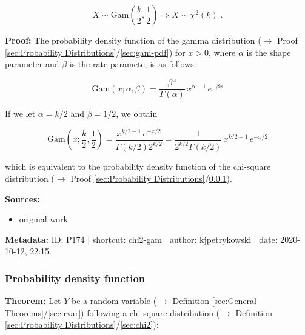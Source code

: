 \documentclass[a4paper,12pt,twoside]{book}
\begin{document}
\begin{equation} \label{eq:chi2-gam-chi2-gam}
X \sim \mathrm{Gam}\left( \frac{k}{2}, \frac{1}{2} \right) \Rightarrow X \sim \chi^{2}(k) \; .
\end{equation}


\vspace{1em}
\textbf{Proof:} The probability density function of the gamma distribution ($\rightarrow$ Proof \ref{sec:Probability Distributions}/\ref{sec:gam-pdf}) for $x > 0$, where $\alpha$ is the shape parameter and $\beta$ is the rate paramete, is as follows:

\begin{equation} \label{eq:chi2-gam-gam-pdf}
\mathrm{Gam}(x; \alpha, \beta) = \frac{\beta^{\alpha}}{\Gamma(\alpha)} \, x^{\alpha-1} \, e^{-\beta x}
\end{equation}

If we let $\alpha = k/2$ and $\beta = 1/2$, we obtain

\begin{equation} \label{eq:chi2-gam-gam-pdf-chi2}
\mathrm{Gam}\left(x; \frac{k}{2}, \frac{1}{2}\right) = \frac{x^{k/2-1} \, e^{-x/2}}{\Gamma(k/2) 2^{k/2}} = \frac{1}{2^{k/2} \Gamma(k/2)} \, x^{k/2-1} \, e^{-x/2}
\end{equation}

which is equivalent to the probability density function of the chi-square distribution ($\rightarrow$ Proof \ref{sec:Probability Distributions}/\ref{sec:chi2-pdf}).


\vspace{1em}
\textbf{Sources:}
\begin{itemize}
\item original work\end{itemize}


\vspace{1em}
\textbf{Metadata:} ID: P174 | shortcut: chi2-gam | author: kjpetrykowski | date: 2020-10-12, 22:15.
\vspace{1em}



\subsubsection[\textbf{Probability density function}]{Probability density function} \label{sec:chi2-pdf}
\setcounter{equation}{0}

\textbf{Theorem:} Let $Y$ be a random variable ($\rightarrow$ Definition \ref{sec:General Theorems}/\ref{sec:rvar}) following a chi-square distribution ($\rightarrow$ Definition \ref{sec:Probability Distributions}/\ref{sec:chi2}):
\end{document}
